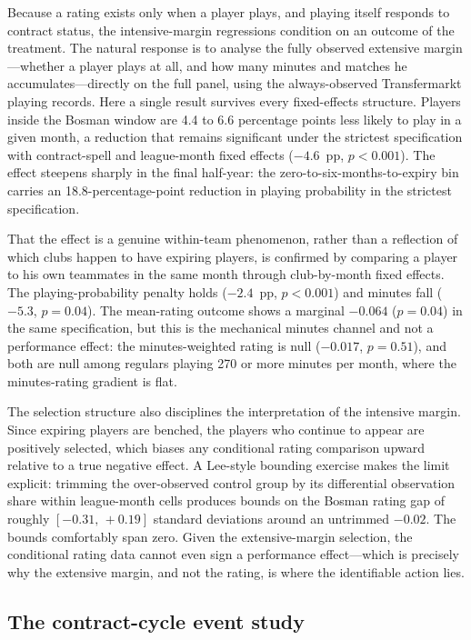 Because a rating exists only when a player plays, and playing itself responds to
contract status, the intensive-margin regressions condition on an outcome of the
treatment. The natural response is to analyse the fully observed extensive
margin---whether a player plays at all, and how many minutes and matches he
accumulates---directly on the full panel, using the always-observed
Transfermarkt playing records. Here a single result survives every
fixed-effects structure. Players inside the Bosman window are 4.4 to 6.6
percentage points less likely to play in a given month, a reduction that remains
significant under the strictest specification with contract-spell and
league-month fixed effects ($-4.6$~pp, $p < 0.001$). The effect steepens sharply
in the final half-year: the zero-to-six-months-to-expiry bin carries an
18.8-percentage-point reduction in playing probability in the strictest
specification.

That the effect is a genuine within-team phenomenon, rather than a reflection of
which clubs happen to have expiring players, is confirmed by comparing a player
to his own teammates in the same month through club-by-month fixed effects. The
playing-probability penalty holds ($-2.4$~pp, $p < 0.001$) and minutes fall
($-5.3$, $p = 0.04$). The mean-rating outcome shows a marginal $-0.064$
($p = 0.04$) in the same specification, but this is the mechanical minutes
channel and not a performance effect: the minutes-weighted rating is null
($-0.017$, $p = 0.51$), and both are null among regulars playing 270 or more
minutes per month, where the minutes-rating gradient is flat.

The selection structure also disciplines the interpretation of the intensive
margin. Since expiring players are benched, the players who continue to appear
are positively selected, which biases any conditional rating comparison upward
relative to a true negative effect. A Lee-style bounding exercise makes the
limit explicit: trimming the over-observed control group by its differential
observation share within league-month cells produces bounds on the Bosman rating
gap of roughly $[-0.31,\, +0.19]$ standard deviations around an untrimmed
$-0.02$. The bounds comfortably span zero. Given the extensive-margin selection,
the conditional rating data cannot even sign a performance effect---which is
precisely why the extensive margin, and not the rating, is where the
identifiable action lies.

\subsection{The contract-cycle event study}
\label{sec:results-eventstudy}

